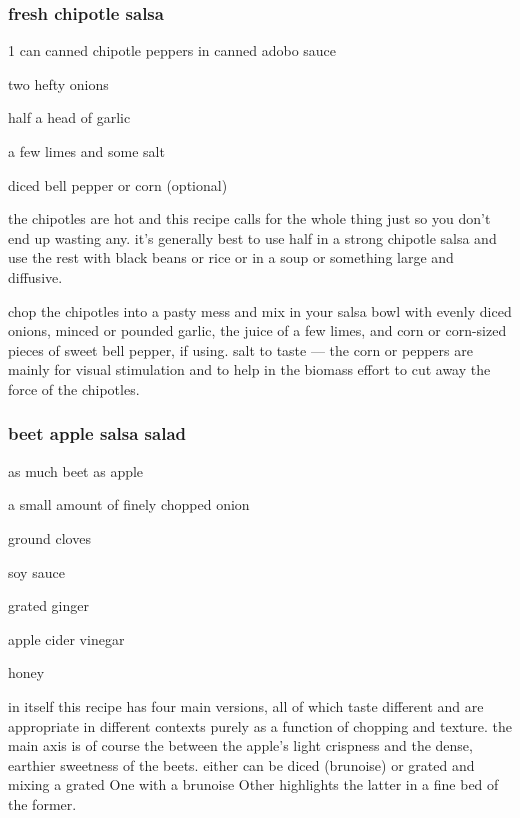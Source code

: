 \subsubsection{fresh chipotle salsa}

\begin{ingredients}
  \item 1 can canned chipotle peppers in canned adobo sauce
  \item two hefty onions
  \item half a head of garlic
  \item a few limes and some salt
  \item diced bell pepper or corn (optional)
\end{ingredients}

the chipotles are hot and this recipe calls for the whole thing just
so you don't end up wasting any. it's generally best to use half in a
strong chipotle salsa and use the rest with black beans or rice or in
a soup or something large and diffusive.

chop the chipotles into a pasty mess and mix in your salsa bowl with
evenly diced onions, minced or pounded garlic, the juice of a few
limes, and corn or corn-sized pieces of sweet bell pepper, if
using. salt to taste --- the corn or peppers are mainly for visual
stimulation and to help in the biomass effort to cut away the force of
the chipotles.

\subsubsection{beet apple salsa salad}

\begin{ingredients}
  \item as much beet as apple
  \item a small amount of finely chopped onion
  \item ground cloves
  \item soy sauce
  \item grated ginger
  \item apple cider vinegar
  \item honey
\end{ingredients}

in itself this recipe has four main versions, all of which taste
different and are appropriate in different contexts purely as a
function of chopping and texture. the main axis is of course the
 between the apple's light crispness and the dense, earthier
sweetness of the beets. either can be diced (brunoise) or grated and
mixing a grated One with a brunoise Other highlights the latter in a
fine bed of the former.

